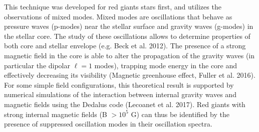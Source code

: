 This technique was developed for red giants stars first, and utilizes the observations of mixed modes. Mixed modes are
oscillations that behave as pressure waves (p-modes) near the stellar surface and gravity waves (g-modes) in the stellar core.
The study of these oscillations allows to determine properties of both core and stellar envelope (e.g. Beck et al. 2012).
The presence of a strong magnetic field in the core is able to alter the propagation of the gravity waves (in particular the dipolar $\ell =1$ modes),
trapping mode energy in the core and effectively decreasing its visibility \citep{Fuller_2015} (Magnetic greenhouse effect, Fuller et al. 2016).
For some simple field configurations, this theoretical result is supported  by numerical simulations of the interaction between
internal gravity waves and magnetic fields using the Dedalus code (Lecoanet et al. 2017).
Red giants with strong internal magnetic fields (B $> 10^5$ G) can thus be identified by the presence of suppressed oscillation modes in their oscillation spectra.

